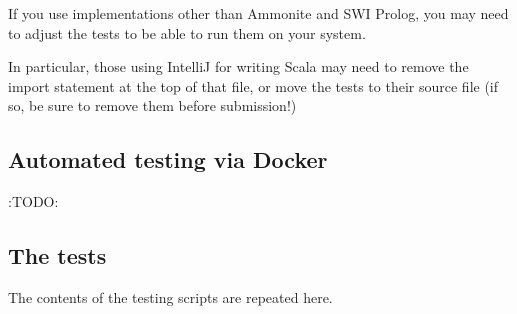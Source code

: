 \documentclass[11pt]{article}
\begin{document}
If you use implementations other than Ammonite and SWI Prolog,
you may need to adjust the tests to be able to run them
on your system.

In particular, those using IntelliJ for writing Scala
may need to remove the import statement at the top of that file,
or move the tests to their source file
(if so, be sure to remove them before submission!)

\subsection*{Automated testing via Docker}
\label{sec:orgeb1c87a}
:TODO:

\subsection*{The tests}
\label{sec:orgcd31717}
The contents of the testing scripts are repeated here.
\end{document}
